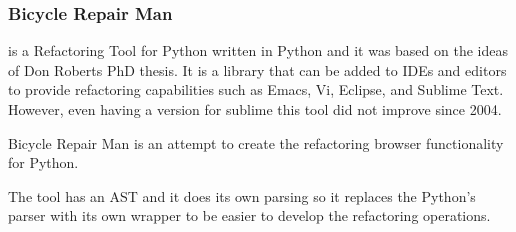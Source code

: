 
\subsubsection{Bicycle Repair Man}

 is a Refactoring Tool for Python written in Python and it was based on the ideas of Don Roberts PhD thesis. 
 It is a library that can be added to IDEs and editors to provide refactoring capabilities such as Emacs, Vi, Eclipse, and Sublime Text. 
 However, even having a version for sublime this tool did not improve since 2004.

Bicycle Repair Man is an attempt to create the refactoring browser functionality for Python. 

The tool has an AST and it does its own parsing so it replaces the Python's parser with its own wrapper to be easier to develop the refactoring operations.


